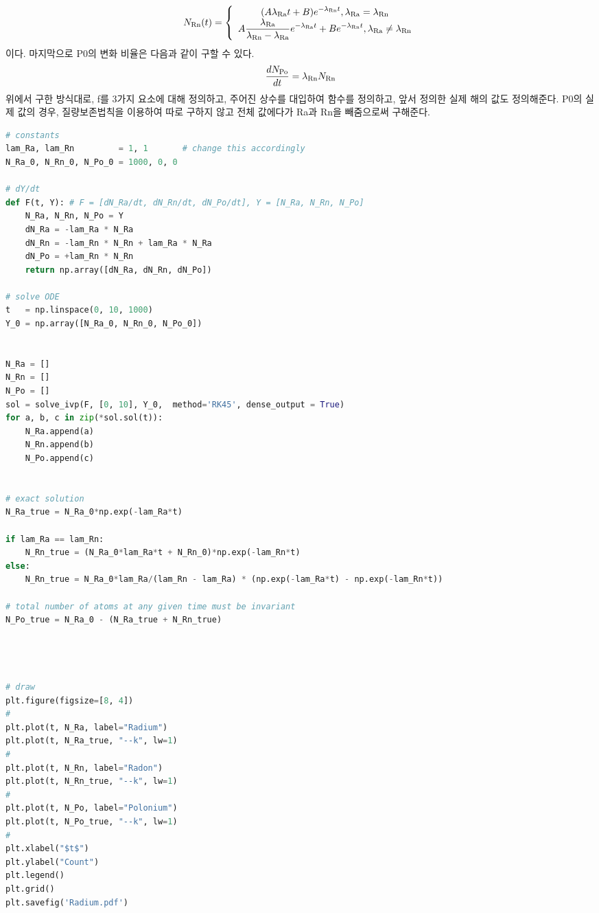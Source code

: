 \documentclass[11pt]{article}
\begin{document}
\begin{equation}
\begin{split}
N_{\rm Rn}(t)
=
\left\{
\begin{array}{c}
\displaystyle (A\lambda_{\rm Ra}t + B) e^{-\lambda_{\rm Rn} t}, \lambda_{\rm Ra} = \lambda_{\rm Rn}
\\
\displaystyle A \frac{\lambda_{\rm Ra}}{\lambda_{\rm Rn} - \lambda_{\rm Ra}} e^{-\lambda_{\rm Ra}t} + B e^{-\lambda_{\rm Rn} t} , \lambda_{\rm Ra} \ne \lambda_{\rm Rn}
\end{array}
\right.
\end{split}
\end{equation}
이다. 마지막으로 P0의 변화 비율은 다음과 같이 구할 수 있다.
\begin{equation}
\frac{dN_{\rm Po}}{dt} = \lambda_{\rm Rn} N_{\rm Rn}
\end{equation}
위에서 구한 방식대로, f를 3가지 요소에 대해 정의하고, 주어진 상수를 대입하여 함수를 정의하고, 앞서 정의한 실제 해의 값도 정의해준다.  P0의 실제 값의 경우, 질량보존법칙을 이용하여 따로 구하지 않고 전체 값에다가 Ra과 Rn을 빼줌으로써 구해준다. 
\begin{lstlisting}[language=Python]
# constants
lam_Ra, lam_Rn         = 1, 1       # change this accordingly
N_Ra_0, N_Rn_0, N_Po_0 = 1000, 0, 0

# dY/dt
def F(t, Y): # F = [dN_Ra/dt, dN_Rn/dt, dN_Po/dt], Y = [N_Ra, N_Rn, N_Po]
    N_Ra, N_Rn, N_Po = Y
    dN_Ra = -lam_Ra * N_Ra
    dN_Rn = -lam_Rn * N_Rn + lam_Ra * N_Ra
    dN_Po = +lam_Rn * N_Rn
    return np.array([dN_Ra, dN_Rn, dN_Po])

# solve ODE
t   = np.linspace(0, 10, 1000)
Y_0 = np.array([N_Ra_0, N_Rn_0, N_Po_0])


N_Ra = []
N_Rn = []
N_Po = []
sol = solve_ivp(F, [0, 10], Y_0,  method='RK45', dense_output = True)
for a, b, c in zip(*sol.sol(t)):
    N_Ra.append(a)
    N_Rn.append(b)
    N_Po.append(c)


# exact solution
N_Ra_true = N_Ra_0*np.exp(-lam_Ra*t)

if lam_Ra == lam_Rn:
    N_Rn_true = (N_Ra_0*lam_Ra*t + N_Rn_0)*np.exp(-lam_Rn*t)
else:
    N_Rn_true = N_Ra_0*lam_Ra/(lam_Rn - lam_Ra) * (np.exp(-lam_Ra*t) - np.exp(-lam_Rn*t))

# total number of atoms at any given time must be invariant
N_Po_true = N_Ra_0 - (N_Ra_true + N_Rn_true)



    
# draw
plt.figure(figsize=[8, 4])
#
plt.plot(t, N_Ra, label="Radium")
plt.plot(t, N_Ra_true, "--k", lw=1)
#
plt.plot(t, N_Rn, label="Radon")
plt.plot(t, N_Rn_true, "--k", lw=1)
#
plt.plot(t, N_Po, label="Polonium")
plt.plot(t, N_Po_true, "--k", lw=1)
#
plt.xlabel("$t$")
plt.ylabel("Count")
plt.legend()
plt.grid()
plt.savefig('Radium.pdf')
\end{lstlisting}
\end{document}
